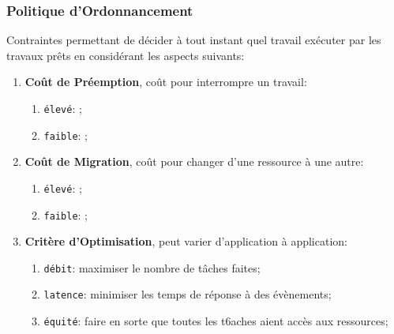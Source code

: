 \documentclass{article}
\begin{document}
\subsubsection{Politique d'Ordonnancement}
\begin{definition}\label{def:politiqueOrdonnancement}
    Contraintes permettant de décider à tout instant quel travail exécuter par les travaux prêts en considérant les aspects suivants:
    \begin{enumerate}[noitemsep]
        \item \textbf{Coût de Préemption}, coût pour interrompre un travail:
        \begin{enumerate}[noitemsep]
            \item \texttt{élevé}: ;
            \item \texttt{faible}: ;
        \end{enumerate}
        \item \textbf{Coût de Migration}, coût pour changer d'une ressource à une autre:
        \begin{enumerate}[noitemsep]
            \item \texttt{élevé}: ;
            \item \texttt{faible}: ;
        \end{enumerate}
        \item \textbf{Critère d'Optimisation}, peut varier d'application à application:
        \begin{enumerate}[noitemsep]
            \item \texttt{débit}: maximiser le nombre de tâches faites;
            \item \texttt{latence}: minimiser les temps de réponse à des évènements;
            \item \texttt{équité}: faire en sorte que toutes les t6aches aient accès aux ressources;
        \end{enumerate}
    \end{enumerate}
\end{definition}
\end{document}
